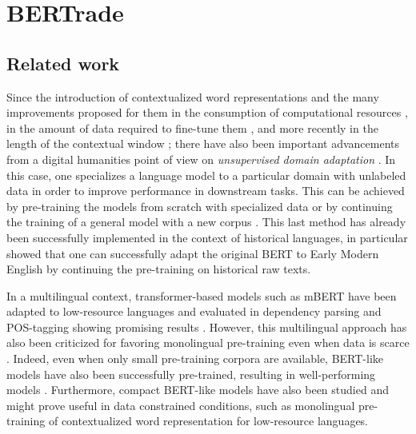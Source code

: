 \chapter{BERTrade}

\section{Related work}
\label{sec-related}
Since the introduction of contextualized word representations \citep{peters-etal-2018-deep,akbik-etal-2018-contextual,devlin-etal-2019-bert} and the many improvements proposed for them in the consumption of computational resources \citep{clark-etal-2020-electra}, in the amount of data required to fine-tune them \citep{raffel-etal-2020-exploring}, and more recently in the length of the contextual window \citep{xiong-etal-2021-nystromformer}; there have also been important advancements from a digital humanities point of view on \emph{unsupervised domain adaptation} \citep{ramponi-plank-2020-neural}. In this case, one specializes a language model to a particular domain with unlabeled data in order to improve performance in downstream tasks. This can be achieved by  pre-training the models from scratch with specialized data \citep{beltagy-etal-2019-scibert} or by continuing the training of a general model with a new corpus \citep{lee-etal-2019-BioBERT, peng-etal-2019-transfer}. This last method has already been successfully implemented in the context of historical languages, in particular \citet{han-eisenstein-2019-unsupervised} showed that one can successfully adapt the original BERT \citep{devlin-etal-2019-bert} to Early Modern English by continuing the pre-training on historical raw texts.

In a multilingual context, transformer-based models such as mBERT have been adapted to low-resource languages and evaluated in dependency parsing and POS-tagging showing promising results \citep{chau-etal-2020-parsing, muller-etal-2021-unseen, gururangan-etal-2020-dont, wang-etal-2020-extending}. However, this multilingual approach has also been criticized for favoring monolingual pre-training even when data is scarce \citep{virtanen-etal-2019-multilingual, ortiz-suarez-etal-2020-monolingual}. Indeed, even when only small pre-training corpora are available, BERT-like models have also been successfully pre-trained, resulting in well-performing models \citep{micheli-etal-2020-importance}. Furthermore, compact BERT-like models have also been studied \citep{turc-etal-2019-well} and might prove useful in data constrained conditions, such as monolingual pre-training of contextualized word representation for low-resource languages.

